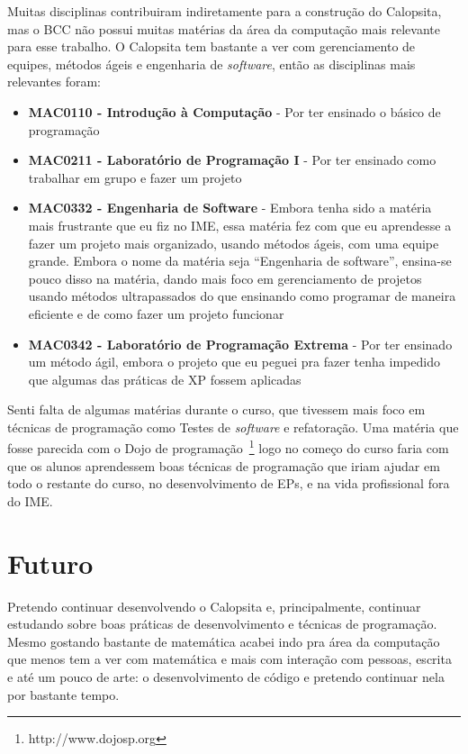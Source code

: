 \documentclass[titlepage,a4paper]{article}
\newcommand{\software}{\textit{software}}
\newcommand{\calopsita}{Calopsita}
\begin{document}
Muitas disciplinas contribuiram indiretamente para a construção do \calopsita{}, mas o BCC não possui muitas matérias da área da computação mais relevante para esse trabalho. O \calopsita{} tem bastante a ver com gerenciamento de equipes, métodos ágeis e engenharia de \software{}, então as disciplinas mais relevantes foram:

\begin{itemize}
	\item{\textbf{MAC0110 - Introdução à Computação} - Por ter ensinado o básico de programação}
	\item{\textbf{MAC0211 - Laboratório de Programação I} - Por ter ensinado como trabalhar em grupo e fazer um projeto}
	\item{\textbf{MAC0332 - Engenharia de Software} - Embora tenha sido a matéria mais frustrante que eu fiz no IME, essa matéria fez com que eu aprendesse a fazer um projeto mais organizado, usando métodos ágeis, com uma equipe grande. Embora o nome da matéria seja ``Engenharia de software'', ensina-se pouco disso na matéria, dando mais foco em gerenciamento de projetos usando métodos ultrapassados do que ensinando como programar de maneira eficiente e de como fazer um projeto funcionar}
	\item{\textbf{MAC0342 - Laboratório de Programação Extrema } - Por ter ensinado um método ágil, embora o projeto que eu peguei pra fazer tenha impedido que algumas das práticas de XP fossem aplicadas}
\end{itemize}

Senti falta de algumas matérias durante o curso, que tivessem mais foco em técnicas de programação como Testes de \software{} e refatoração. Uma matéria que fosse parecida com o Dojo de programação~\footnote{http://www.dojosp.org} logo no começo do curso faria com que os alunos aprendessem boas técnicas de programação que iriam ajudar em todo o restante do curso, no desenvolvimento de EPs, e na vida profissional fora do IME.

\section{Futuro}

Pretendo continuar desenvolvendo o \calopsita{} e, principalmente, continuar estudando sobre boas práticas de desenvolvimento e técnicas de programação. Mesmo gostando bastante de matemática acabei indo pra área da computação que menos tem a ver com matemática e mais com interação com pessoas, escrita e até um pouco de arte: o desenvolvimento de código e pretendo continuar nela por bastante tempo.
\end{document}
